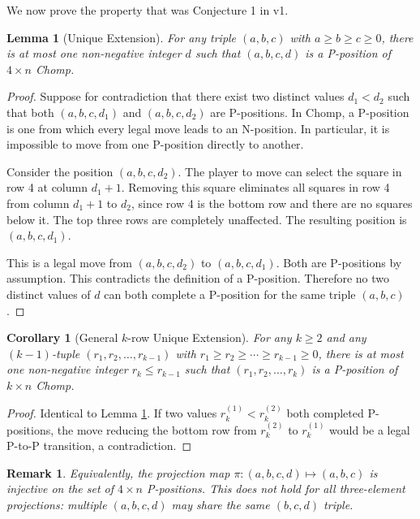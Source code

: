 \documentclass[12pt]{article}
\newtheorem{lemma}{Lemma}
\newtheorem{corollary}{Corollary}
\newtheorem{remark}{Remark}
\begin{document}
We now prove the property that was Conjecture 1 in v1.

\begin{lemma}[Unique Extension]
\label{lem:unique}
For any triple $(a, b, c)$ with $a \geq b \geq c \geq 0$, there is
at most one non-negative integer $d$ such that $(a, b, c, d)$ is a
P-position of $4 \times n$ Chomp.
\end{lemma}

\begin{proof}
Suppose for contradiction that there exist two distinct values
$d_1 < d_2$ such that both $(a, b, c, d_1)$ and $(a, b, c, d_2)$
are P-positions. In Chomp, a P-position is one from which every
legal move leads to an N-position. In particular, it is impossible
to move from one P-position directly to another.

Consider the position $(a, b, c, d_2)$. The player to move can
select the square in row 4 at column $d_1 + 1$. Removing this square
eliminates all squares in row 4 from column $d_1 + 1$ to $d_2$,
since row 4 is the bottom row and there are no squares below it.
The top three rows are completely unaffected. The resulting position
is $(a, b, c, d_1)$.

This is a legal move from $(a, b, c, d_2)$ to $(a, b, c, d_1)$.
Both are P-positions by assumption. This contradicts the definition
of a P-position. Therefore no two distinct values of $d$ can both
complete a P-position for the same triple $(a, b, c)$.
\end{proof}

\begin{corollary}[General $k$-row Unique Extension]
\label{cor:general}
For any $k \geq 2$ and any $(k-1)$-tuple $(r_1, r_2, \ldots, r_{k-1})$
with $r_1 \geq r_2 \geq \cdots \geq r_{k-1} \geq 0$, there is at most
one non-negative integer $r_k \leq r_{k-1}$ such that
$(r_1, r_2, \ldots, r_k)$ is a P-position of $k \times n$ Chomp.
\end{corollary}

\begin{proof}
Identical to Lemma \ref{lem:unique}. If two values $r_k^{(1)} < r_k^{(2)}$ both completed P-positions, the move reducing the bottom
row from $r_k^{(2)}$ to $r_k^{(1)}$ would be a legal P-to-P
transition, a contradiction.
\end{proof}

\begin{remark}
Equivalently, the projection map $\pi: (a,b,c,d) \mapsto (a,b,c)$
is injective on the set of $4 \times n$ P-positions. This does not
hold for all three-element projections: multiple $(a,b,c,d)$ may
share the same $(b,c,d)$ triple.
\end{remark}
\end{document}
